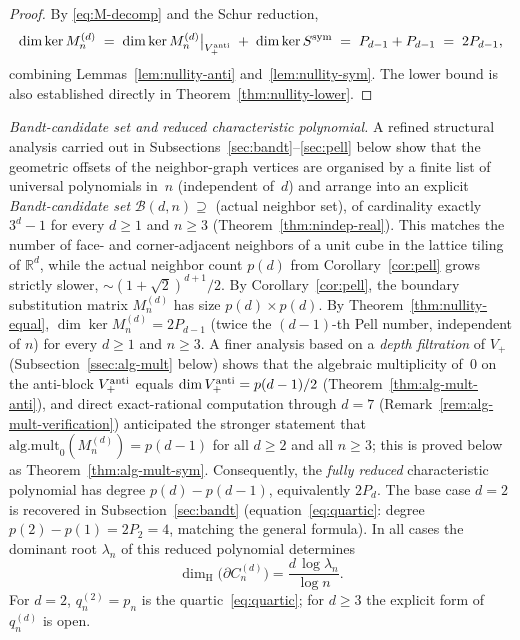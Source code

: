 \documentclass{amsart}
\theoremstyle{definition}
\theoremstyle{remark}
\newcommand{\R}{\mathbb{R}}
\newcommand{\dH}{\dim_{\mathrm{H}}}
\begin{document}
\begin{proof}
By \eqref{eq:M-decomp} and the Schur reduction,
\[
  \dim \ker M_n^{(d)}
  \;=\; \dim \ker M_n^{(d)}\big|_{V_+^{\rm anti}}
   \;+\; \dim \ker S^{\rm sym}
  \;=\; P_{d-1} + P_{d-1}
  \;=\; 2 P_{d-1},
\]
combining Lemmas~\ref{lem:nullity-anti}
and~\ref{lem:nullity-sym}.  The lower bound is also
established directly in Theorem~\ref{thm:nullity-lower}.
\end{proof}

\medskip
\noindent\textit{Bandt-candidate set and reduced characteristic
polynomial.}
A refined structural analysis carried out in
Subsections~\ref{sec:bandt}--\ref{sec:pell} below show that the geometric
offsets of the neighbor-graph vertices are organised by a finite
list of universal polynomials in~$n$ (independent of~$d$) and
arrange into an explicit \emph{Bandt-candidate set}
$\mathcal{B}(d, n) \supseteq$ (actual neighbor set), of cardinality
exactly $3^d - 1$ for every $d \ge 1$ and $n \ge 3$
\textup{(}Theorem~\ref{thm:nindep-real}\textup{)}.
This matches the number of face- and corner-adjacent neighbors of
a unit cube in the lattice tiling of $\R^d$, while the actual
neighbor count $p(d)$ from Corollary~\ref{cor:pell}
grows strictly slower, $\sim (1{+}\sqrt{2})^{d+1}/2$.
By Corollary~\ref{cor:pell}, the boundary
substitution matrix $M_n^{(d)}$ has size $p(d) \times p(d)$.
By Theorem~\ref{thm:nullity-equal},
$\dim\ker M_n^{(d)} = 2 P_{d-1}$ \textup{(}twice the
$(d{-}1)$-th Pell number, independent of $n$\textup{)}
for every $d \ge 1$ and $n \ge 3$.  A finer analysis based on a
\emph{depth filtration} of $V_+$
(Subsection~\ref{ssec:alg-mult} below) shows that the
algebraic multiplicity of~$0$ on the anti-block $V_+^{\rm anti}$
equals $\dim V_+^{\rm anti} = p(d-1)/2$
(Theorem~\ref{thm:alg-mult-anti}), and direct exact-rational
computation through $d = 7$
(Remark~\ref{rem:alg-mult-verification}) anticipated the
stronger statement that
$\mathrm{alg.mult}_0(M_n^{(d)}) = p(d-1)$ for all $d \ge 2$ and
all $n \ge 3$; this is proved below as
Theorem~\ref{thm:alg-mult-sym}.  Consequently, the \emph{fully
reduced} characteristic
polynomial has degree $p(d) - p(d-1)$, equivalently $2 P_d$.
The base case $d = 2$ is recovered in
Subsection~\ref{sec:bandt} (equation~\eqref{eq:quartic}: degree
$p(2)-p(1)=2P_2 = 4$, matching the general formula).  In all cases
the dominant root $\lambda_n$ of this reduced polynomial
determines
\begin{equation}\label{eq:dim-d}
  \dH\bigl(\partial C_n^{(d)}\bigr)
  = \frac{d\,\log\lambda_n}{\log n}.
\end{equation}
For $d = 2$, $q_n^{(2)} = p_n$ is the quartic~\eqref{eq:quartic};
for $d \ge 3$ the explicit form of $q_n^{(d)}$ is open.
\end{document}

